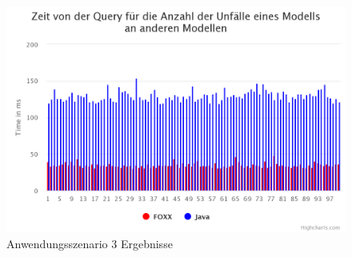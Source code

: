 \begin{figure}[htbp] 
  	\centering
     \includegraphics[width=1\textwidth]{./images/8.UseCase3Diagramm.png}
 	\caption{Anwendungsszenario 3 Ergebnisse}
  \label{fig:DataSchema}
\end{figure}